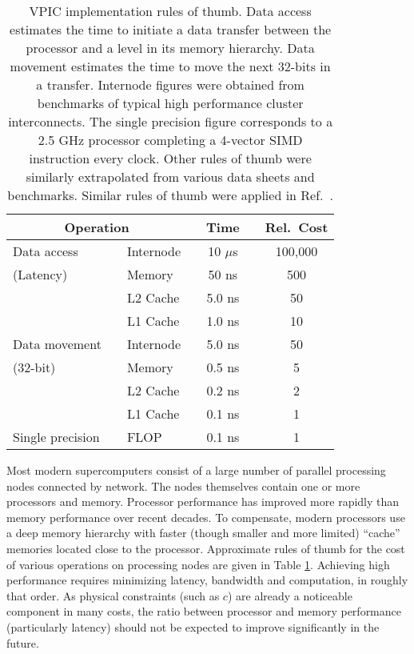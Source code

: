 \documentclass[letter,10pt]{article}
\newcommand{\tbl}[1]{Table \ref{tbl:#1}}
\begin{document}
\begin{table}
\caption{\label{tbl:Rules_of_thumb}
VPIC implementation rules of thumb.  Data access estimates the time to
initiate a data transfer between the processor and a level in its
memory hierarchy.  Data movement estimates the time to move the next
32-bits in a transfer.  Internode figures were obtained from
benchmarks of typical high performance cluster interconnects.  The
single precision figure corresponds to a 2.5 GHz processor completing
a 4-vector SIMD instruction every clock.  Other rules of thumb were
similarly extrapolated from various data sheets and benchmarks.
Similar rules of thumb were applied in Ref.~\cite{Bowers_et_al_2006}.}

\begin{center}
\begin{tabular}{l l l c c c c}
\hline
\hline
\multicolumn{3}{c}{Operation} & \hspace{18pt} & Time & \hspace{18pt} & Rel.~Cost \\
\hline
Data access      & \hspace{9pt} & Internode & & 10 $\mu$s & & 100,000 \\
(Latency)        & & Memory    & & 50 ns     & & 500     \\
                 & & L2 Cache  & & 5.0 ns    & & 50      \\
\vspace{4pt}     & & L1 Cache  & & 1.0 ns    & & 10      \\
Data movement    & & Internode & & 5.0 ns    & & 50      \\
(32-bit)         & & Memory    & & 0.5 ns    & & 5       \\
                 & & L2 Cache  & & 0.2 ns    & & 2       \\
\vspace{4pt}     & & L1 Cache  & & 0.1 ns    & & 1       \\
Single precision & & FLOP      & & 0.1 ns    & & 1       \\
\hline
\hline
\end{tabular}
\end{center}
\end{table}

Most modern supercomputers consist of a large number of parallel
processing nodes connected by network.  The nodes themselves contain
one or more processors and memory.  Processor performance has improved
more rapidly than memory performance over recent decades.  To
compensate, modern processors use a deep memory hierarchy with faster
(though smaller and more limited) ``cache'' memories located close to
the processor.  Approximate rules of thumb for the cost of various
operations on processing nodes are given in \tbl{Rules_of_thumb}.
Achieving high performance requires minimizing latency, bandwidth and
computation, in roughly that order.  As physical constraints (such as
$c$) are already a noticeable component in many costs, the ratio
between processor and memory performance (particularly latency) should
not be expected to improve significantly in the future.
\end{document}
